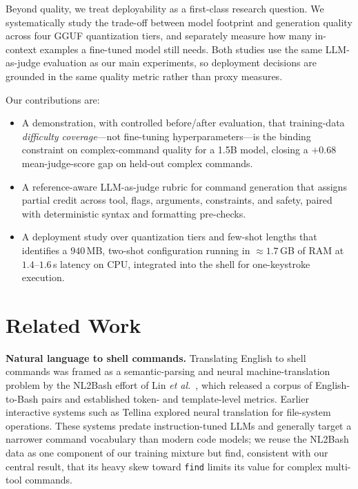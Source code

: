 \documentclass[conference]{IEEEtran}
\begin{document}
Beyond quality, we treat deployability as a first-class research question. We
systematically study the trade-off between model footprint and generation
quality across four GGUF quantization tiers, and separately measure how many
in-context examples a fine-tuned model still needs. Both studies use the same
LLM-as-judge evaluation as our main experiments, so deployment decisions are
grounded in the same quality metric rather than proxy measures.

Our contributions are:
\begin{itemize}
  \item A demonstration, with controlled before/after evaluation, that
        training-data \emph{difficulty coverage}---not fine-tuning
        hyperparameters---is the binding constraint on complex-command quality
        for a 1.5B model, closing a $+0.68$ mean-judge-score gap on held-out
        complex commands.
  \item A reference-aware LLM-as-judge rubric for command generation that
        assigns partial credit across tool, flags, arguments, constraints, and
        safety, paired with deterministic syntax and formatting pre-checks.
  \item A deployment study over quantization tiers and few-shot lengths that
        identifies a $940$\,MB, two-shot configuration running in
        $\approx 1.7$\,GB of RAM at $1.4$--$1.6$\,s latency on CPU, integrated
        into the shell for one-keystroke execution.
\end{itemize}

\section{Related Work}

\textbf{Natural language to shell commands.} Translating English to shell
commands was framed as a semantic-parsing and neural machine-translation problem
by the NL2Bash effort of Lin \emph{et al.}~\cite{lin2018nl2bash}, which released
a corpus of English-to-Bash pairs and established token- and template-level
metrics. Earlier interactive systems such as Tellina explored neural translation
for file-system operations. These systems predate instruction-tuned LLMs and
generally target a narrower command vocabulary than modern code models; we reuse
the NL2Bash data as one component of our training mixture but find, consistent
with our central result, that its heavy skew toward \texttt{find} limits its
value for complex multi-tool commands.
\end{document}
